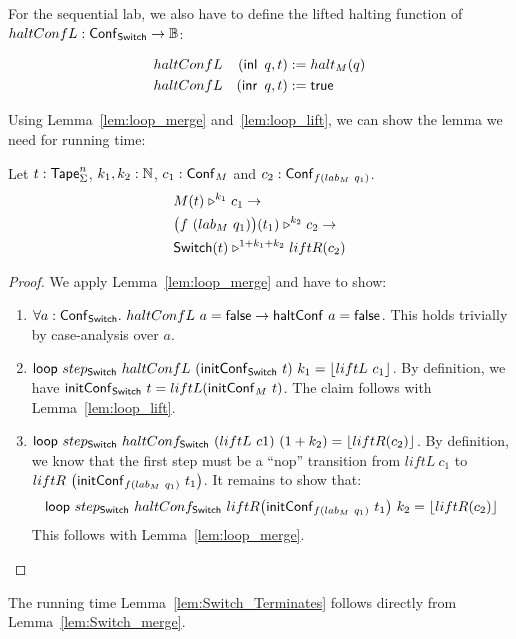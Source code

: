 For the sequential lab, we also have to define the lifted halting function of \\$haltConfL : \mathsf{Conf}_{\mathsf{Switch}} \rightarrow \mathbb{B}$:
\begin{definition}
  \begin{alignat*}{2}
    & haltConfL & (\operatorname{\mathsf{inl}}~q, t) &:= halt_M(q) \\
    & haltConfL & (\operatorname{\mathsf{inr}}~q, t) &:= \mathsf{true}
  \end{alignat*}
\end{definition}

Using Lemma~\ref{lem:loop_merge} and~\ref{lem:loop_lift}, we can show the lemma we need for running time:
\begin{lemma}
  \label{lem:Switch_merge}
  Let $t : \mathsf{Tape}_\Sigma^n$, $k_1, k_2:\mathbb{N}$, $c_1 : \mathsf{Conf}_M$ and $c_2 : \mathsf{Conf}_{f(lab_M~q_1)}$.
  \begin{alignat*}{1}
    & M(t) \mathrel{\triangleright}^{k_1} c_1 \rightarrow\\
    & \bigl( f~(lab_M~q_1) \bigr) (t_1) \mathrel{\triangleright}^{k_2} c_2 \rightarrow\\
    & \mathsf{Switch}(t) \mathrel{\triangleright}^{1+k_1+k_2} liftR(c_2)
  \end{alignat*}
\end{lemma}
\begin{proof}
  We apply Lemma~\ref{lem:loop_merge} and have to show:
  \begin{enumerate}
  \item $\forall a:\mathsf{Conf}_{\mathsf{Switch}}.~ haltConfL~a = \mathsf{false} \rightarrow \mathsf{haltConf}~a = \mathsf{false}$.  This holds trivially by case-analysis over $a$.
  \item $\mathsf{loop}~step_{\mathsf{Switch}}~haltConfL~(\mathsf{initConf}_{\mathsf{Switch}}~t)~k_1 =
    \left\lfloor {liftL~c_1} \right\rfloor$.  By definition, we have $\mathsf{initConf}_{\mathsf{Switch}}~t=liftL(\mathsf{initConf}_M~t)$.  The claim follows with Lemma~\ref{lem:loop_lift}.
  \item $\mathsf{loop}~step_{\mathsf{Switch}}~haltConf_{\mathsf{Switch}}~(liftL~c1)~(1+k_2) =
    \left\lfloor {liftR(c_2)} \right\rfloor$.  By definition, we know that the first step must be a ``nop'' transition from
    $liftL~c_1$ to\\
    $liftR~\bigl(\mathsf{initConf}_{f(lab_M~q_1)}~t_1 \bigr)$.  It remains to show that:
    $$\mathsf{loop}~step_{\mathsf{Switch}}~haltConf_{\mathsf{Switch}}~liftR \bigl(\mathsf{initConf}_{f(lab_M~q_1)}~t_1 \bigr)~k_2 = \left\lfloor {liftR(c_2)} \right\rfloor$$
    This follows with Lemma~\ref{lem:loop_merge}.
  \end{enumerate}
\end{proof}
The running time Lemma~\ref{lem:Switch_Terminates} follows directly from Lemma~\ref{lem:Switch_merge}.

